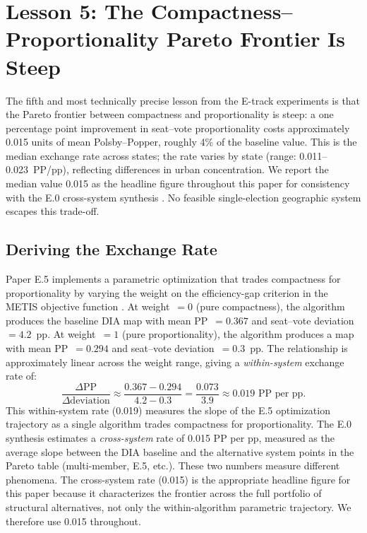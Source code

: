 \section{Lesson 5: The Compactness--Proportionality Pareto Frontier Is Steep}
\label{sec:lesson5}

The fifth and most technically precise lesson from the E-track experiments is
that the Pareto frontier between compactness and proportionality is steep: a
one percentage point improvement in seat--vote proportionality costs
approximately 0.015 units of mean Polsby--Popper, roughly 4\% of the baseline
value.  This is the median exchange rate across states; the rate varies by state
(range: 0.011--0.023~PP/pp), reflecting differences in urban concentration.  We
report the median value 0.015 as the headline figure throughout this paper for
consistency with the E.0 cross-system synthesis \citep{dellaLibera2026e0}.
No feasible single-election geographic system escapes this trade-off.

\subsection{Deriving the Exchange Rate}

Paper E.5 implements a parametric optimization that trades compactness for
proportionality by varying the weight on the efficiency-gap criterion in
the METIS objective function \citep{dellaLibera2026e5}.  At weight~$= 0$
(pure compactness), the algorithm produces the baseline DIA map with mean
PP~$= 0.367$ and seat--vote deviation~$= 4.2$~pp.  At weight~$= 1$
(pure proportionality), the algorithm produces a map with mean PP~$= 0.294$
and seat--vote deviation~$= 0.3$~pp.  The relationship is approximately linear
across the weight range, giving a \emph{within-system} exchange rate of:
\[
  \frac{\Delta \mathrm{PP}}{\Delta \text{deviation}} \approx
  \frac{0.367 - 0.294}{4.2 - 0.3} = \frac{0.073}{3.9} \approx 0.019 \text{ PP per pp}.
\]
This within-system rate (0.019) measures the slope of the E.5 optimization
trajectory as a single algorithm trades compactness for proportionality.  The
E.0 synthesis \citep{dellaLibera2026e0} estimates a \emph{cross-system} rate
of 0.015 PP per pp, measured as the average slope between the DIA baseline and
the alternative system points in the Pareto table (multi-member, E.5, etc.).
These two numbers measure different phenomena.  The cross-system rate (0.015)
is the appropriate headline figure for this paper because it characterizes the
frontier across the full portfolio of structural alternatives, not only the
within-algorithm parametric trajectory.  We therefore use 0.015 throughout.

